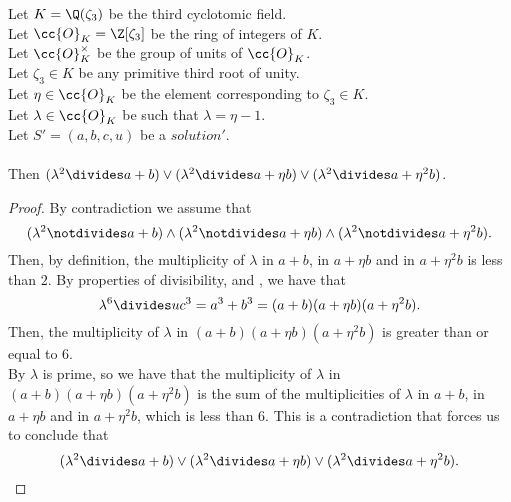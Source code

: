 \begin{lemma}
  \label{lmm:lambda_sq_dvd_or_dvd_or_dvd}
  \leanok
  Let $K = \Q(\zeta_3)$ be the third cyclotomic field. \\
  Let $\cc{O}_K = \Z[\zeta_3]$ be the ring of integers of $K$. \\
  Let $\cc{O}^\times_K$ be the group of units of $\cc{O}_K$. \\
  Let $\zeta_3 \in K$ be any primitive third root of unity. \\
  Let $\eta \in \cc{O}_K$ be the element corresponding to $\zeta_3 \in K$. \\
  Let $\lambda \in \cc{O}_K$ be such that $\lambda = \eta -1$. \\
  Let $S'=(a, b, c, u)$ be a $solution'$.\\\\
  Then $(\lambda^2 \divides a + b) \lor (\lambda^2 \divides a +
  \eta b) \lor (\lambda^2 \divides a + \eta^2 b)$.
\end{lemma}
\begin{proof}
  \leanok
  By contradiction we assume that
  $$(\lambda^2 \notdivides a + b) \land (\lambda^2 \notdivides a +
  \eta b) \land (\lambda^2 \notdivides a + \eta^2 b).$$
  Then, by definition, the multiplicity of $\lambda$ in $a + b$, in $a +
  \eta b$ and in $a + \eta^2 b$ is less than $2$.
  By properties of divisibility,  and ,
  we have that
  $$\lambda^6 \divides u c^3 = a^3 + b^3 = (a + b) (a + \eta b) (a + \eta^2 b).$$
  Then, the multiplicity of $\lambda$ in $(a + b) (a + \eta b) (a + \eta^2 b)$ is greater than
  or equal to $6$. \\
  By  $\lambda$ is prime, so we have that the multiplicity of $\lambda$
  in $(a + b) (a + \eta b) (a + \eta^2 b)$ is the sum of the multiplicities of $\lambda$ in
  $a + b$, in $a + \eta b$ and in $a + \eta^2 b$, which is less than $6$.
  This is a contradiction that forces us to conclude that
  $$(\lambda^2 \divides a + b) \lor (\lambda^2 \divides a +
  \eta b) \lor (\lambda^2 \divides a + \eta^2 b).$$
\end{proof}

